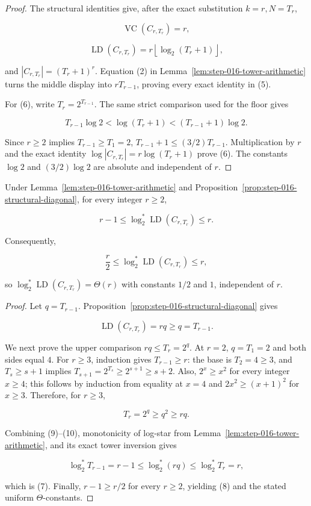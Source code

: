 \begin{proof}
The structural identities give, after the exact substitution
\(k=r,N=T_r\),

\[
\operatorname{VC}(C_{r,T_r})=r,
\]

\[
\operatorname{LD}(C_{r,T_r})
=r\left\lfloor\log_2(T_r+1)\right\rfloor,
\]

and \(|C_{r,T_r}|=(T_r+1)^r\). Equation (2) in
Lemma~\ref{lem:step-016-tower-arithmetic} turns the middle display into
\(rT_{r-1}\), proving every exact identity in (5).

For (6), write \(T_r=2^{T_{r-1}}\). The same strict comparison used for
the floor gives

\[
T_{r-1}\log2
  <\log(T_r+1)
  <(T_{r-1}+1)\log2.
\]

Since \(r\ge2\) implies \(T_{r-1}\ge T_1=2\),
\(T_{r-1}+1\le(3/2)T_{r-1}\). Multiplication by \(r\) and the exact
identity \(\log|C_{r,T_r}|=r\log(T_r+1)\) prove (6). The constants
\(\log2\) and \((3/2)\log2\) are absolute and independent of \(r\).
\end{proof}

\begin{lemma}\label{lem:step-016-ld-logstar}
Under Lemma~\ref{lem:step-016-tower-arithmetic} and
Proposition~\ref{prop:step-016-structural-diagonal}, for every integer
\(r\ge2\),

\[
r-1
\le
\log_2^*\operatorname{LD}(C_{r,T_r})
\le r.
\tag{7}
\]

Consequently,

\[
\frac r2
\le
\log_2^*\operatorname{LD}(C_{r,T_r})
\le r,
\tag{8}
\]

so \(\log_2^*\operatorname{LD}(C_{r,T_r})=\Theta(r)\) with constants
\(1/2\) and \(1\), independent of \(r\).
\end{lemma}

\begin{proof}
Let \(q=T_{r-1}\). Proposition~\ref{prop:step-016-structural-diagonal}
gives

\[
\operatorname{LD}(C_{r,T_r})=rq\ge q=T_{r-1}.
\tag{9}
\]

We next prove the upper comparison \(rq\le T_r=2^q\). At \(r=2\),
\(q=T_1=2\) and both sides equal \(4\). For \(r\ge3\), induction gives
\(T_{r-1}\ge r\): the base is \(T_2=4\ge3\), and
\(T_s\ge s+1\) implies \(T_{s+1}=2^{T_s}\ge2^{s+1}\ge s+2\).
Also, \(2^x\ge x^2\) for every integer \(x\ge4\); this follows by
induction from equality at \(x=4\) and
\(2x^2\ge(x+1)^2\) for \(x\ge3\). Therefore, for \(r\ge3\),

\[
T_r=2^q\ge q^2\ge rq.
\tag{10}
\]

Combining (9)--(10), monotonicity of log-star from
Lemma~\ref{lem:step-016-tower-arithmetic}, and its exact tower inversion
gives

\[
\log_2^*T_{r-1}=r-1
\le\log_2^*(rq)
\le\log_2^*T_r=r,
\]

which is (7). Finally, \(r-1\ge r/2\) for every \(r\ge2\), yielding
(8) and the stated uniform \(\Theta\)-constants. \end{proof}

